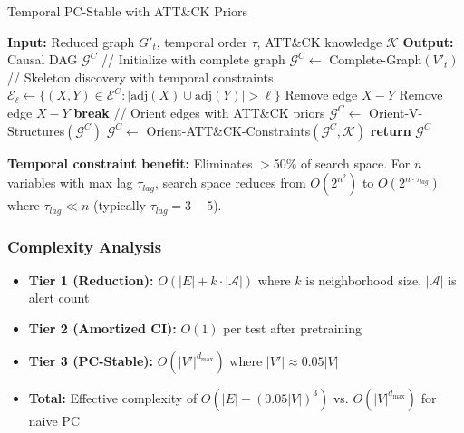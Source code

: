 \documentclass[conference]{IEEEtran}
\begin{document}
\begin{algorithm}
\caption{Temporal PC-Stable with ATT\&CK Priors}
\begin{algorithmic}[1]
\STATE \textbf{Input:} Reduced graph $G'_t$, temporal order $\tau$, ATT\&CK knowledge $\mathcal{K}$
\STATE \textbf{Output:} Causal DAG $\mathcal{G}^C$
\STATE
\STATE // Initialize with complete graph
\STATE $\mathcal{G}^C \leftarrow$ Complete-Graph$(V'_t)$
\STATE
\STATE // Skeleton discovery with temporal constraints
    \STATE $\mathcal{E}_{\ell} \leftarrow \{(X,Y) \in \mathcal{E}^C : |\text{adj}(X) \cup \text{adj}(Y)| > \ell\}$
    \STATE
            \STATE Remove edge $X - Y$ 
        \ELSE
                    \STATE Remove edge $X - Y$
                    \STATE \textbf{break}
                \ENDIF
            \ENDFOR
        \ENDIF
    \ENDFOR
\ENDFOR
\STATE
\STATE // Orient edges with ATT\&CK priors
\STATE $\mathcal{G}^C \leftarrow$ Orient-V-Structures$(\mathcal{G}^C)$
\STATE $\mathcal{G}^C \leftarrow$ Orient-ATT\&CK-Constraints$(\mathcal{G}^C, \mathcal{K})$
\STATE \textbf{return} $\mathcal{G}^C$
\end{algorithmic}
\end{algorithm}

\textbf{Temporal constraint benefit:} Eliminates $>$50\% of search space. For $n$ variables with max lag $\tau_{lag}$, search space reduces from $O(2^{n^2})$ to $O(2^{n \cdot \tau_{lag}})$ where $\tau_{lag} \ll n$ (typically $\tau_{lag} = 3-5$).

\subsubsection{Complexity Analysis}

\begin{itemize}
    \item \textbf{Tier 1 (Reduction):} $O(|E| + k \cdot |\mathcal{A}|)$ where $k$ is neighborhood size, $|\mathcal{A}|$ is alert count
    \item \textbf{Tier 2 (Amortized CI):} $O(1)$ per test after pretraining
    \item \textbf{Tier 3 (PC-Stable):} $O(|V'|^{d_{\max}})$ where $|V'| \approx 0.05|V|$
    \item \textbf{Total:} Effective complexity of $O(|E| + (0.05|V|)^3)$ vs. $O(|V|^{d_{\max}})$ for naive PC
\end{itemize}
\end{document}

